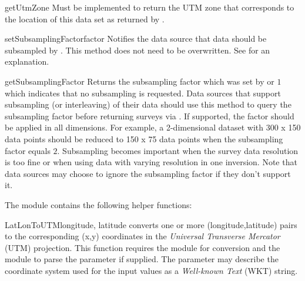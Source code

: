 \begin{methoddesc}[DataSource]{getUtmZone}{}
Must be implemented to return the UTM zone that corresponds to the location of
this data set as returned by .
\end{methoddesc}

\begin{methoddesc}[DataSource]{setSubsamplingFactor}{factor}
Notifies the data source that data should be subsampled by .
This method does not need to be overwritten.
See  for an explanation.
\end{methoddesc}

\begin{methoddesc}[DataSource]{getSubsamplingFactor}{}
Returns the subsampling factor which was set by 
or $1$ which indicates that no subsampling is requested.
Data sources that support subsampling (or interleaving) of their data should use
this method to query the subsampling factor before returning surveys via
. If supported, the factor should be applied in all
dimensions. For example, a 2-dimensional dataset with 300 x 150 data points
should be reduced to 150 x 75 data points when the subsampling factor equals $2$.
Subsampling becomes important when the survey data resolution is too fine or
when using data with varying resolution in one inversion.
Note that data sources may choose to ignore the subsampling factor if they
don't support it.
\end{methoddesc}

\vspace{1em}\noindent The  module contains the following helper
functions:

\begin{funcdesc}{LatLonToUTM}{longitude, latitude%
}
converts one or more (longitude,latitude) pairs to the corresponding (x,y)
coordinates in the \emph{Universal Transverse Mercator} (UTM) projection.
This function requires the  module for conversion and the
 module to parse the  parameter if supplied.
The  parameter may describe the coordinate system used
for the input values as a \emph{Well-known Text} (WKT) string.
\end{funcdesc}

